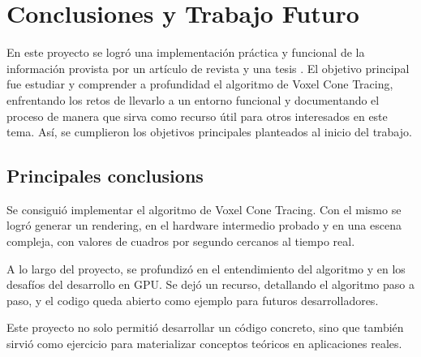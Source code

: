 \graphicspath{{chapters/6_conclusión/figures/}}



\chapter{Conclusiones y Trabajo Futuro}\label{chap:conclusions}

En este proyecto se logró una implementación práctica y funcional de la información provista por un artículo de revista \cite{voxel-cone-tracing} y una tesis \cite{gigavoxels}.
El objetivo principal fue estudiar y comprender a profundidad el algoritmo de Voxel Cone Tracing, enfrentando los retos de llevarlo a un entorno funcional y documentando el proceso de manera que sirva como recurso útil para otros interesados en este tema.
Así, se cumplieron los objetivos principales planteados al inicio del trabajo.

\section{Principales conclusions}

Se consiguió implementar el algoritmo de Voxel Cone Tracing.
Con el mismo se logró generar un rendering, en el hardware intermedio probado y en una escena compleja, con valores de cuadros por segundo cercanos al tiempo real.

A lo largo del proyecto, se profundizó en el entendimiento del algoritmo y en los desafíos del desarrollo en GPU.
Se dejó un recurso, detallando el algoritmo paso a paso, y el codigo queda abierto como ejemplo para futuros desarrolladores.

Este proyecto no solo permitió desarrollar un código concreto, sino que también sirvió como ejercicio para materializar conceptos teóricos en aplicaciones reales.


